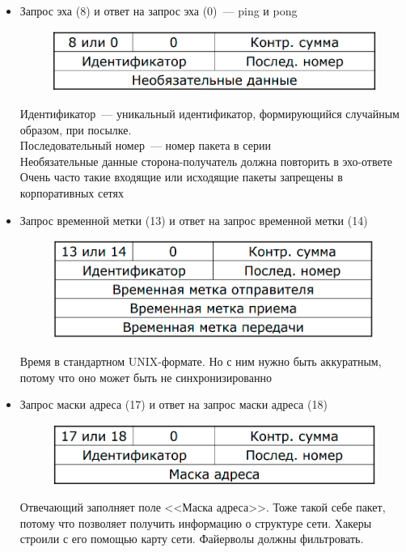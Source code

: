 
\begin{itemize}
    \item Запрос эха (8) и ответ на запрос эха (0)~--- ping и pong\\
    \begin{figure}[H]
        \centering
        \includegraphics[width=15cm]{images/02/15}
    \end{figure}
    Идентификатор~--- уникальный идентификатор, формирующийся случайным образом, при посылке.\\
    Последовательный номер~--- номер пакета в серии\\
    Необязательные данные сторона-получатель должна повторить в эхо-ответе\\
    Очень часто такие входящие или исходящие пакеты запрещены в корпоративных сетях 
    \item Запрос временной метки (13) и ответ на запрос временной метки (14)\\
    \begin{figure}[H]
        \centering
        \includegraphics[width=15cm]{images/02/16}
    \end{figure}
    Время в стандартном UNIX-формате. Но с ним нужно быть аккуратным, потому что оно может быть не синхронизированно
    \item Запрос маски адреса (17) и ответ на запрос маски адреса (18)\\
    \begin{figure}[H]
        \centering
        \includegraphics[width=15cm]{images/02/17}
    \end{figure}
    Отвечающий заполняет поле <<Маска адреса>>. Тоже такой себе пакет, потому что позволяет получить информацию о структуре сети. Хакеры строили с его помощью карту сети. Файерволы должны фильтровать.
\end{itemize}